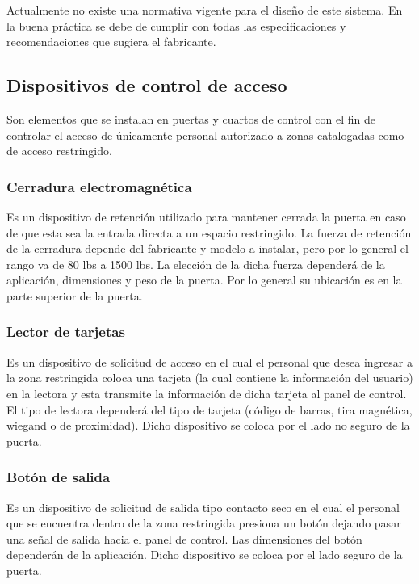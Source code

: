 Actualmente no existe una normativa vigente para el diseño de este sistema. En la buena práctica se debe de cumplir con todas las especificaciones y recomendaciones que sugiera el fabricante.


\subsection{Dispositivos de control de acceso}

Son elementos que se instalan en puertas y cuartos de control con el fin de controlar el acceso de únicamente personal autorizado a zonas catalogadas como de acceso restringido.

\subsubsection{Cerradura electromagnética}

Es un dispositivo de retención utilizado para mantener cerrada la puerta en caso de que esta sea la entrada directa a un espacio restringido. La fuerza de retención de la cerradura depende del fabricante y modelo a instalar, pero por lo general el rango va de 80 lbs a 1500 lbs. La elección de la dicha fuerza dependerá de la aplicación, dimensiones y peso de la puerta. Por lo general su ubicación es en la parte superior de la puerta. \cite{CIEMI} \cite{Secolarm}


\subsubsection{Lector de tarjetas}

Es un dispositivo de solicitud de acceso en el cual el personal que desea ingresar a la zona restringida coloca una tarjeta (la cual contiene la información del usuario) en la lectora y esta transmite la información de dicha tarjeta al panel de control. El tipo de lectora dependerá del tipo de tarjeta (código de barras, tira magnética, wiegand o de proximidad). Dicho dispositivo se coloca por el lado no seguro de la puerta. \cite{CIEMI}


\subsubsection{Botón de salida}

Es un dispositivo de solicitud de salida tipo contacto seco en el cual el personal que se encuentra dentro de la zona restringida presiona un botón dejando pasar una señal de salida hacia el panel de control. Las dimensiones del botón dependerán de la aplicación. Dicho dispositivo se coloca por el lado seguro de la puerta. \cite{CIEMI}


